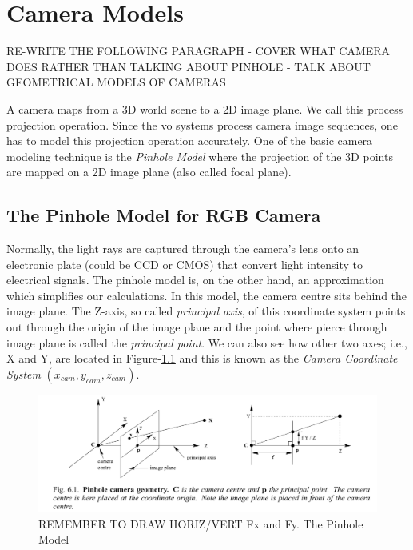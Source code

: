 \documentclass[a4paper]{report}
\numberwithin{figure}{section}
\begin{document}
\chapter{Camera Models} \label{cp_cam_models}

RE-WRITE THE FOLLOWING PARAGRAPH - COVER WHAT CAMERA DOES RATHER THAN 
TALKING ABOUT PINHOLE - TALK ABOUT GEOMETRICAL MODELS OF CAMERAS

A camera maps from a 3D world scene to a 2D image plane. We call this process 
projection operation. Since the \acrshort{vo} systems process camera image 
sequences, one has to model this projection operation accurately. One of the 
basic camera modeling technique is the \textit{Pinhole Model} where the projection of 
the 3D points are mapped on a 2D image plane (also called focal plane). 

\section{The Pinhole Model for RGB Camera} \label{sc_pinhole}

Normally, the light rays 
are captured through the camera's lens onto an electronic plate (could be CCD or CMOS) 
that convert light intensity to electrical signals. 
The pinhole model is, on the other hand, an approximation which simplifies 
our calculations.
In this model, the camera centre sits behind the image plane.
The Z-axis, 
so called \textit{principal axis}, of this 
coordinate system points out through the origin of the image plane and the 
point where pierce through image plane is called the \textit{principal point}. 
We can also see how other two axes; i.e., X and Y, are located in Figure-\ref{fig:pinhole} 
and this is known as the \textit{Camera Coordinate System} $(x_{cam}, y_{cam}, z_{cam})$.


\begin{figure}[H]
	\centering
	\includegraphics[width=\linewidth,natwidth=640,natheight=640]
  {fig/ref_imgs/pinhole_model.png}
  \caption{REMEMBER TO DRAW HORIZ/VERT Fx and Fy. The Pinhole Model}
	\label{fig:pinhole}
\end{figure}
\end{document}

